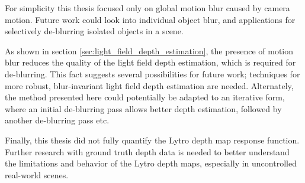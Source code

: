 For simplicity this thesis focused only on global motion blur caused by camera motion.
Future work could look into individual object blur, and applications for selectively de-blurring isolated objects in a scene.

As shown in section \ref{sec:light_field_depth_estimation}, the presence of motion blur reduces the quality of the light field depth estimation, which is required for de-blurring.
This fact suggests several possibilities for future work; techniques for more robust, blur-invariant light field depth estimation are needed.
Alternately, the method presented here could potentially be adapted to an iterative form, where an initial de-blurring pass allows better depth estimation, followed by another de-blurring pass etc.

Finally, this thesis did not fully quantify the Lytro depth map response function.
Further research with ground truth depth data is needed to better understand the limitations and behavior of the Lytro depth maps, especially in uncontrolled real-world scenes.


